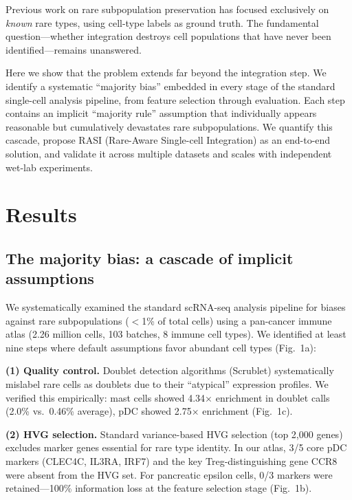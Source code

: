 \documentclass[10pt]{article}
\begin{document}
Previous work on rare subpopulation preservation\cite{xiong2022,andreatta2021,zhao2024} has focused exclusively on \textit{known} rare types, using cell-type labels as ground truth. The fundamental question---whether integration destroys cell populations that have never been identified---remains unanswered.

Here we show that the problem extends far beyond the integration step. We identify a systematic ``majority bias'' embedded in every stage of the standard single-cell analysis pipeline, from feature selection through evaluation. Each step contains an implicit ``majority rule'' assumption that individually appears reasonable but cumulatively devastates rare subpopulations. We quantify this cascade, propose RASI (Rare-Aware Single-cell Integration) as an end-to-end solution, and validate it across multiple datasets and scales with independent wet-lab experiments.

\section*{Results}

\subsection*{The majority bias: a cascade of implicit assumptions}

We systematically examined the standard scRNA-seq analysis pipeline for biases against rare subpopulations ($<$1\% of total cells) using a pan-cancer immune atlas (2.26 million cells, 103 batches, 8 immune cell types\cite{kang2024}). We identified at least nine steps where default assumptions favor abundant cell types (Fig.~1a):

\textbf{(1) Quality control.} Doublet detection algorithms (Scrublet\cite{wolock2019}) systematically mislabel rare cells as doublets due to their ``atypical'' expression profiles. We verified this empirically: mast cells showed 4.34$\times$ enrichment in doublet calls (2.0\% vs.\ 0.46\% average), pDC showed 2.75$\times$ enrichment (Fig.~1c).

\textbf{(2) HVG selection.} Standard variance-based HVG selection (top 2,000 genes) excludes marker genes essential for rare type identity. In our atlas, 3/5 core pDC markers (CLEC4C, IL3RA, IRF7) and the key Treg-distinguishing gene CCR8 were absent from the HVG set. For pancreatic epsilon cells, 0/3 markers were retained---100\% information loss at the feature selection stage (Fig.~1b).
\end{document}
